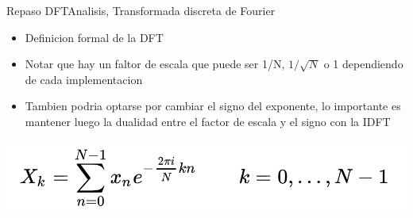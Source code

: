 \begin{frame}{Repaso DFT}{Analisis, Transformada discreta de Fourier}
   \begin{itemize}
      \item{Definicion formal de la DFT}
      \item{Notar que hay un faltor de escala que puede ser 1/N, $1/\sqrt{N}$ o 1 dependiendo de cada implementacion}
      \item{Tambien podria optarse por cambiar el signo del exponente, lo importante es mantener luego la dualidad entre el factor de escala y el signo con la IDFT}
   \end{itemize}
   \center\includegraphics[width=1.0\textwidth]{3_clase/dft_eq}
   \vfill
\end{frame}
